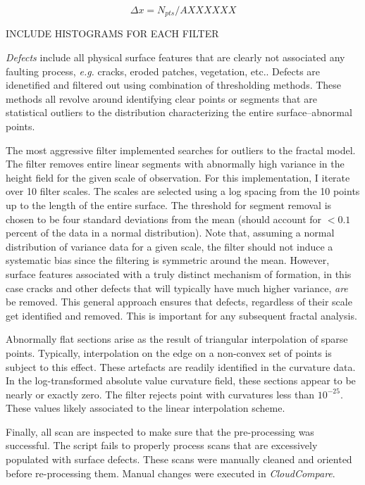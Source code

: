 \documentclass[12pt,a4paper]{article}
\begin{document}
\begin{equation}
	\Delta x = N_{pts}/A XXXXXX
\end{equation}

INCLUDE HISTOGRAMS FOR EACH FILTER


\textit{Defects} include all physical surface features that are clearly not associated any faulting process, \textit{e.g.} cracks, eroded patches, vegetation, etc.. Defects are idenetified and filtered out using combination of thresholding methods. These methods all revolve around identifying clear points or segments that are statistical outliers to the distribution characterizing the entire surface--abnormal points. 

The most aggressive filter implemented searches for outliers to the fractal model. The filter removes entire linear segments with abnormally high variance in the height field for the given scale of observation. For this implementation, I iterate over 10 filter scales. The scales are selected using a log spacing from the 10 points up to the length of the entire surface. The threshold for segment removal is chosen to be four standard deviations from the mean (should account for $<0.1$ percent of the data in a normal distribution). Note that, assuming a normal distribution of variance data for a given scale, the filter should not induce a systematic bias since the filtering is symmetric around the mean. However, surface features associated with a truly distinct mechanism of formation, in this case cracks and other defects that will typically have much higher variance, \textit{are} be removed. This general approach ensures that defects, regardless of their scale get identified and removed. This is important for any subsequent fractal analysis.

Abnormally flat sections arise as the result of triangular interpolation of sparse points. Typically, interpolation on the edge on a non-convex set of points is subject to this effect. These artefacts are readily identified in the curvature data. In the log-transformed absolute value curvature field, these sections appear to be nearly or exactly zero. The filter rejects point with curvatures less than $10^{-25}$. These values likely associated to the linear interpolation scheme.

Finally, all scan are inspected to make sure that the pre-processing was successful. The script fails to properly process scans that are excessively populated with surface defects. These scans were manually cleaned and oriented before re-processing them. Manual changes were executed in \textit{CloudCompare}. 
\end{document}
